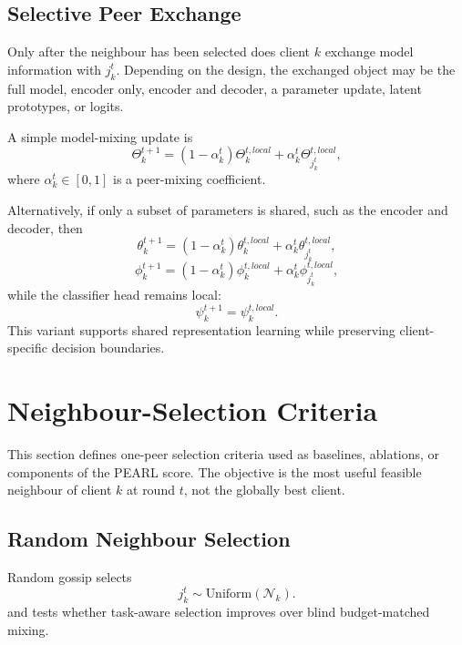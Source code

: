 \documentclass[conference]{IEEEtran}
\begin{document}
\subsection{Selective Peer Exchange}
\label{subsec:selective-peer-exchange}
Only after the neighbour has been selected does client \(k\) exchange model information with \(j_k^t\). Depending on the design, the exchanged object may be the full model, encoder only, encoder and decoder, a parameter update, latent prototypes, or logits.

A simple model-mixing update is
\begin{equation}
    \Theta_k^{t+1}
    =
    (1-\alpha_k^t)\Theta_k^{t,local}
    +
    \alpha_k^t \Theta_{j_k^t}^{t,local},
    \label{eq:model_mixing}
\end{equation}
where \(\alpha_k^t\in[0,1]\) is a peer-mixing coefficient.

Alternatively, if only a subset of parameters is shared, such as the encoder and decoder, then
\begin{equation*}
    \theta_k^{t+1}
    =
    (1-\alpha_k^t)\theta_k^{t,local}
    +
    \alpha_k^t \theta_{j_k^t}^{t,local},
\end{equation*}
\begin{equation*}
    \phi_k^{t+1}
    =
    (1-\alpha_k^t)\phi_k^{t,local}
    +
    \alpha_k^t \phi_{j_k^t}^{t,local},
\end{equation*}
while the classifier head remains local:
\begin{equation*}
    \psi_k^{t+1}=\psi_k^{t,local}.
\end{equation*}
This variant supports shared representation learning while preserving client-specific decision boundaries.

\section{Neighbour-Selection Criteria}
\label{sec:neighbour-selection-criteria}

This section defines one-peer selection criteria used as baselines, ablations, or components of the PEARL score. The objective is the most useful feasible neighbour of client $k$ at round $t$, not the globally best client.

\subsection{Random Neighbour Selection}
\label{subsec:random-neighbour-selection}
Random gossip selects
\begin{equation*}
    j_k^t \sim \text{Uniform}(\mathcal{N}_k).
\end{equation*}
and tests whether task-aware selection improves over blind budget-matched mixing.
\end{document}
